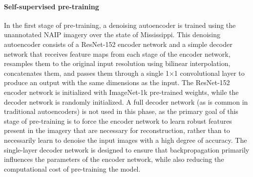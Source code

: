 \paragraph{Self-supervised pre-training}
In the first stage of pre-training, a denoising autoencoder is trained using the unannotated NAIP imagery over the state of Mississippi.
This denoising autoencoder consists of a ResNet-152 encoder network and a simple decoder network that receives feature maps from each stage of the encoder network, resamples them to the original input resolution using bilinear interpolation, concatenates them, and passes them through a single 1\(\times\)1 convolutional layer to produce an output with the same dimensions as the input.
The ResNet-152 encoder network is initialized with ImageNet-1k pre-trained weights, while the decoder network is randomly initialized.
A full decoder network (as is common in traditional autoencoders) is not used in this phase, as the primary goal of this stage of pre-training is to force the encoder network to learn robust features present in the imagery that are necessary for reconstruction, rather than to necessarily learn to denoise the input images with a high degree of accuracy.
The single-layer decoder network is designed to ensure that backpropagation primarily influences the parameters of the encoder network, while also reducing the computational cost of pre-training the model.

